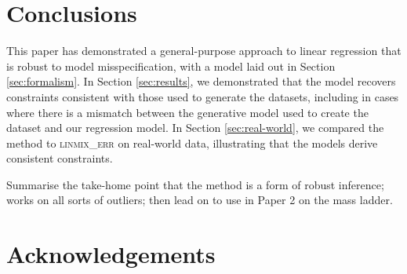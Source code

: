 \documentclass[fleqn,usenatbib]{mnras}
\begin{document}



\section{Conclusions}
\label{sec:conclusion}

This paper has demonstrated a general-purpose approach to linear regression that
is robust to model misspecification, with a model laid out in Section
\ref{sec:formalism}. In Section \ref{sec:results}, we demonstrated that the
model recovers constraints consistent with those used to generate the datasets,
including in cases where there is a mismatch between the generative model used
to create the dataset and our regression model. In Section \ref{sec:real-world},
we compared the method to \textsc{linmix\_err} \citep{Kelly:2007} on real-world
data, illustrating that the models derive consistent constraints.

Summarise the take-home point that the method is a form of robust inference;
works on all sorts of outliers; then lead on to use in Paper 2 on the mass
ladder.

\section*{Acknowledgements}
\end{document}
